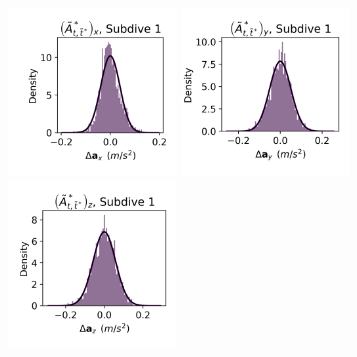 \documentclass{article}
\begin{document}
        \begin{center}
        \includegraphics[width=1.75in]{../Plots/2019/20190902-182840-CATs_OB_1_0_267_CarHHMM2_empirical_hist_Ax_0.png}
        \includegraphics[width=1.75in]{../Plots/2019/20190902-182840-CATs_OB_1_0_267_CarHHMM2_empirical_hist_Ay_0.png}
        \includegraphics[width=1.75in]{../Plots/2019/20190902-182840-CATs_OB_1_0_267_CarHHMM2_empirical_hist_Az_0.png}
        

\end{center}
\end{document}

